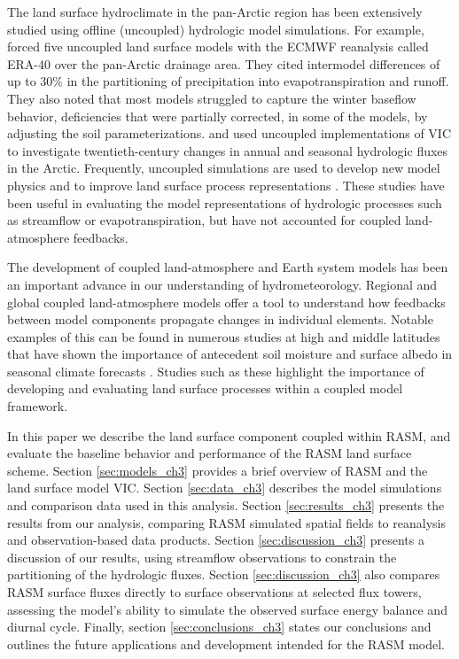 The land surface hydroclimate in the pan-Arctic region has been extensively studied using offline (uncoupled) hydrologic model simulations.
For example, \citet{Slater_2007} forced five uncoupled land surface models with the ECMWF reanalysis called ERA-40 over the pan-Arctic drainage area.
They cited intermodel differences of up to 30\% in the partitioning of precipitation into evapotranspiration and runoff.
They also noted that most models struggled to capture the winter baseflow behavior, deficiencies that were partially corrected, in some of the models, by adjusting the soil parameterizations.
\citet{Adam_2007} and \citet{Tan_2011} used uncoupled implementations of VIC to investigate twentieth-century changes in annual and seasonal hydrologic fluxes in the Arctic.
Frequently, uncoupled simulations are used to develop new model physics and to improve land surface process representations \citep{Bonan_2011,Bowling_2004,Bowling_2010,Cherkauer_2003,Swenson_2012}.
These studies have been useful in evaluating the model representations of hydrologic processes such as streamflow or evapotranspiration, but have not accounted for coupled land-atmosphere feedbacks.

The development of coupled land-atmosphere and Earth system models has been an important advance in our understanding of hydrometeorology.
Regional and global coupled land-atmosphere models offer a tool to understand how feedbacks between model components propagate changes in individual elements.
Notable examples of this can be found in numerous studies at high and middle latitudes that have shown the importance of antecedent soil moisture and surface albedo in seasonal climate forecasts \citep{Beljaars_1996,Betts_2004,Dominguez_2006,Koster_2004}.
Studies such as these highlight the importance of developing and evaluating land surface processes within a coupled model framework.

In this paper we describe the land surface component coupled within RASM, and evaluate the baseline behavior and performance of the RASM land surface scheme.
Section \ref{sec:models_ch3} provides a brief overview of RASM and the land surface model VIC.
Section \ref{sec:data_ch3} describes the model simulations and comparison data used in this analysis.
Section \ref{sec:results_ch3} presents the results from our analysis, comparing RASM simulated spatial fields to reanalysis and observation-based data products.
Section \ref{sec:discussion_ch3} presents a discussion of our results, using streamflow observations to constrain the partitioning of the hydrologic fluxes.
Section \ref{sec:discussion_ch3} also compares RASM surface fluxes directly to surface observations at selected flux towers, assessing the model's ability to simulate the observed surface energy balance and diurnal cycle.
Finally, section \ref{sec:conclusions_ch3} states our conclusions and outlines the future applications and development intended for the RASM model.

